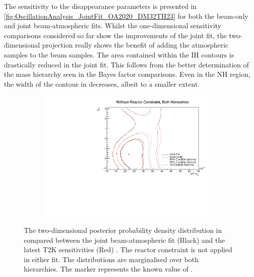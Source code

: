 The sensitivity to the disappearance parameters  is presented in \autoref{fig:OscillationAnalysis_JointFit_OA2020_DM32TH23} for both the beam-only and joint beam-atmospheric fits. Whilst the one-dimensional sensitivity comparisons considered so far show the improvements of the joint fit, the two-dimensional projection really shows the benefit of adding the atmospheric samples to the beam samples. The area contained within the IH contours is drastically reduced in the joint fit. This follows from the better determination of the mass hierarchy seen in the Bayes factor comparisons.
Even in the NH region, the width of the contour in  decreases, albeit to a smaller extent.

\begin{figure}[h]
  \begin{subfigure}[t]{0.98\textwidth}
    \includegraphics[width=\textwidth, trim={0mm 0mm 0mm 0mm}, clip,page=1]{Figures/OA/JointFit_OA2020_Comp/ContourComparison_2D_th13_dcp_BH_0_woRC_UnSmeared_CredibleInterval.pdf}
  \end{subfigure}
  \caption{The two-dimensional posterior probability density distribution in  compared between the joint beam-atmospheric fit (Black) and the latest T2K sensitivities (Red) \cite{Dunne2020-uf, t2k_tn_393}. The reactor constraint is not applied in either fit. The distributions are marginalised over both hierarchies. The marker represents the known value of .}
  \label{fig:OscillationAnalysis_JointFit_OA2020_DCPTH13}
\end{figure}

